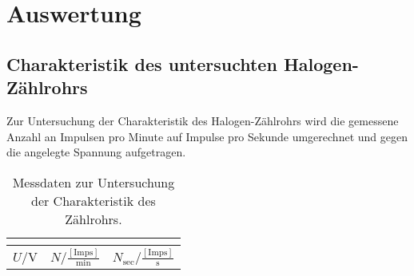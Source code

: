 \section{Auswertung}
\label{sec:Auswertung}
\subsection{Charakteristik des untersuchten Halogen-Zählrohrs}
Zur Untersuchung der Charakteristik des Halogen-Zählrohrs wird die gemessene Anzahl an Impulsen pro Minute auf Impulse pro Sekunde umgerechnet und gegen die angelegte Spannung aufgetragen.


\begin{longtable}{ccc}
  \caption{Messdaten zur Untersuchung der Charakteristik des Zählrohrs.}\\
  \label{tab:a}\\
\toprule
$U$/$\si{\volt}$ &$N$/$\frac{\mathrm{[Imps]}}{\si{\minute}}$&$N_\mathrm{sec}$/$\frac{\mathrm{[Imps]}}{\si{\second}}$ \\


\end{longtable}
